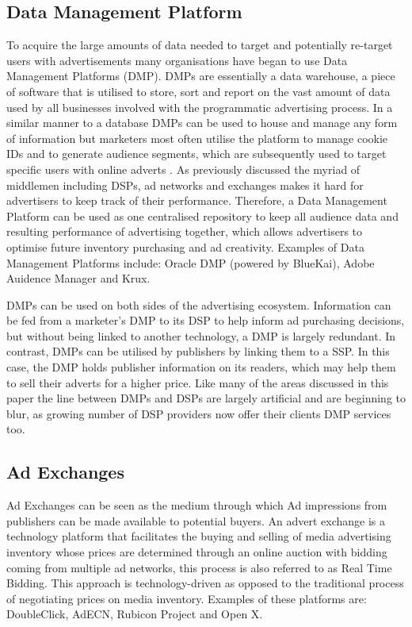 \documentclass{article}
\begin{document}
\subsection{Data Management Platform}
To acquire the large amounts of data needed to target and potentially re-target users with advertisements many organisations have began to use Data Management Platforms (DMP). DMPs are essentially a data warehouse, a piece of software that is utilised to store, sort and report on the vast amount of data used by all businesses involved with the programmatic advertising process. In a similar manner to a database DMPs can be used to house and manage any form of information but marketers most often utilise the platform to manage cookie IDs and to generate audience segments, which are subsequently used to target specific users with online adverts \parencite{DMP}. As previously discussed the myriad of middlemen including DSPs, ad networks and exchanges makes it hard for advertisers to keep track of their performance. Therefore, a Data Management Platform can be used as one centralised repository to keep all audience data and resulting performance of advertising together, which allows advertisers to optimise future inventory purchasing and ad creativity. Examples of Data Management Platforms include: Oracle DMP (powered by BlueKai), Adobe Auidence Manager and Krux. \newline

DMPs can be used on both sides of the advertising ecosystem. Information can be fed from a marketer's DMP to its DSP to help inform ad purchasing decisions, but without being linked to another technology, a DMP is largely redundant. In contrast, DMPs can be 
utilised by publishers by linking them to a SSP. In this case, the DMP holds publisher information on its readers, which may help them to sell their adverts for a higher price. Like many of the areas discussed in this paper the line between DMPs and DSPs are largely artificial and are beginning to blur, as growing number of DSP providers now offer their clients DMP services too.  

\subsection{Ad Exchanges} \label{AdExchanges}
Ad Exchanges can be seen as the medium through which Ad impressions from publishers can be made available to potential buyers. An advert exchange is a technology platform that facilitates the buying and selling of media advertising inventory whose prices are determined through an online auction with bidding coming from multiple ad networks, this process is also referred to as Real Time Bidding. This approach is technology-driven as opposed to the traditional process of negotiating prices on media inventory. Examples of these platforms are: DoubleClick, AdECN, Rubicon Project and Open X. \newline
\end{document}

